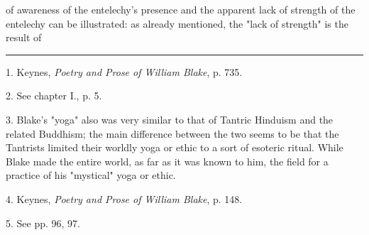 of awareness of the entelechy's presence and the apparent lack of strength of the entelechy
can be illustrated: as already mentioned, the "lack of strength" is the result of\linebreak
\null\par
\vspace*{-\baselineskip}
\vspace*{\fill}
\noindent\rule{0.25\textwidth}{0.4pt}\par
1. Keynes, \textit{Poetry and Prose of William Blake}, p. 735.\par
2. See chapter I., p. 5.\par
3. Blake's "yoga" also was very similar to that of Tantric Hinduism and the related Buddhism; the main difference
between the two seems to be that the Tantrists limited their worldly yoga or ethic to a sort of esoteric ritual. While
Blake made the entire world, as far as it was known to him, the field for a practice of his "mystical" yoga or ethic.\par
4. Keynes, \textit{Poetry and Prose of William Blake}, p. 148.\par
5. See pp. 96, 97.\par

\newpage

